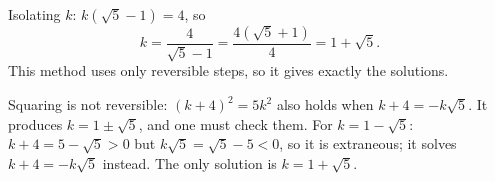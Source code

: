 Isolating $k$: $k(\sqrt5-1)=4$, so
\[k=\dfrac{4}{\sqrt5-1}=\dfrac{4(\sqrt5+1)}{4}=1+\sqrt5.\]
This method uses only reversible steps, so it gives exactly the solutions.

Squaring is not reversible: $(k+4)^2=5k^2$ also holds when $k+4=-k\sqrt5$. It produces $k=1\pm\sqrt5$, and one must check them. For $k=1-\sqrt5$: $k+4=5-\sqrt5>0$ but $k\sqrt5=\sqrt5-5<0$, so it is extraneous; it solves $k+4=-k\sqrt5$ instead. The only solution is $\boxed{k=1+\sqrt5}$.

